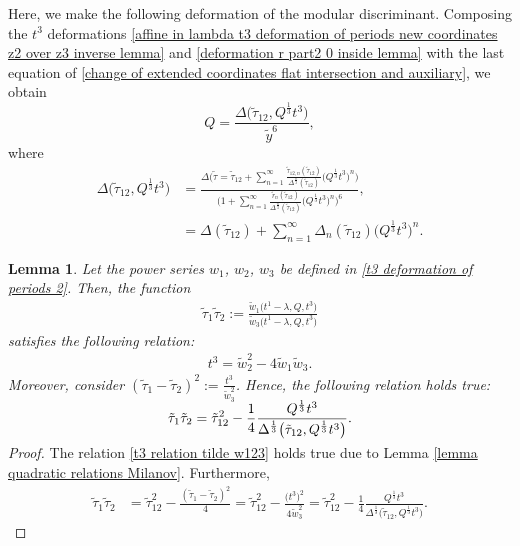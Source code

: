 \documentclass[11pt]{article}
\numberwithin{equation}{section}
\numberwithin{equation}{section}
\newtheorem{Lemma}[Theorem]{Lemma}
\begin{document}
Here, we make the following deformation of the modular discriminant. Composing the $t^3$ deformations \eqref{affine in lambda t3 deformation of periods new coordinates z2 over z3 inverse lemma} and \eqref{deformation r part2 0 inside lemma} with the last equation of \eqref{change of extended coordinates flat intersection and auxiliary}, we obtain
\[%
Q=\frac{\Delta\bigl(\tilde\tau_{12},Q^{\frac{1}{3}} t^3 \bigr)}{\tilde y^6},
\]
where
\begin{align}
\Delta\bigl(\tilde\tau_{12},Q^{\frac{1}{3}}t^3\bigr)&=\frac{\Delta\bigl(\tilde\tau=\tilde\tau_{12}+\sum_{n=1}^{\infty}\frac{\tilde\tau_{12,n}(\tilde\tau_{12})}{\Delta^{\frac{n}{3}}(\tilde\tau_{12})} \bigl( Q^{\frac{1}{3}}t^3\bigr)^n \bigr)}{\bigl( 1+\sum_{n=1}^{\infty} \frac{\tilde r_n(\tilde\tau_{12})}{\Delta^{\frac{n}{3}}(\tilde\tau_{12})} \bigl( Q^{\frac{1}{3}}t^3 \bigr)^n \bigr)^6},\nonumber\\
&=\Delta(\tilde\tau_{12})+\sum_{n=1}^{\infty} \Delta_n(\tilde\tau_{12})\bigl( Q^{\frac{1}{3}}t^3 \bigr)^n.\label{modular deformation tilde 0}
\end{align}



\begin{Lemma}\label{lemma w1 dependence of t3 e Q root 3}
Let the power series $w_1$, $w_2$, $w_3$ be defined in \eqref{t3 deformation of periods 2}.
Then, the function
\begin{gather*}
\tilde\tau_1\tilde\tau_2:= \frac{\tilde w_1\bigl(t^1-\lambda,Q,t^3\bigr)}{\tilde w_3\bigl(t^1-\lambda,Q,t^3\bigr)}
\end{gather*}
satisfies the following relation:
\begin{gather}\label{t3 relation tilde w123}
t^3=\tilde w_2^2-4\tilde w_1\tilde w_3.
\end{gather}
Moreover, consider
$
(\tilde\tau_1-\tilde\tau_2 )^2:=\frac{t^3}{\tilde w_3^2}$.
Hence, the following relation holds true:
\[
\tilde\tau_1\tilde\tau_2=\tilde\tau_{12}^2-\smash{\frac{1}{4}\frac{Q^{\frac{1}{3}}t^3 }{\Delta^{\frac{1}{3}}\bigl(\tilde\tau_{12},Q^{\frac{1}{3}}t^3\bigr)}}.
\]
\end{Lemma}

\begin{proof}
The relation \eqref{t3 relation tilde w123} holds true due to Lemma \ref{lemma quadratic relations Milanov}. Furthermore,
\begin{align*}
\tilde\tau_1\tilde\tau_2&= \tilde\tau_{12}^2-\frac{( \tilde\tau_1-\tilde\tau_2)^2}{4}= \tilde\tau_{12}^2-\frac{\bigl(t^3\bigr)^2}{4\tilde w_3^2}=\tilde\tau_{12}^2-\frac{1}{4}\frac{Q^{\frac{1}{3}}t^3 }{\Delta^{\frac{1}{3}}\bigl(\tilde\tau_{12},Q^{\frac{1}{3}}t^3\bigr)}.\tag*{\qed}
\end{align*} \renewcommand{\qed}{}
\end{proof}
\end{document}
